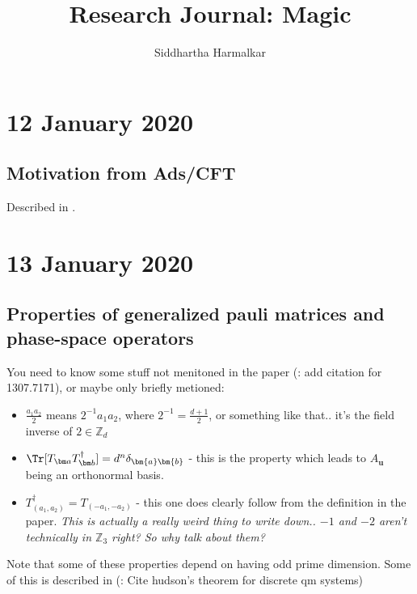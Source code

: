\documentclass{report}
\title{Research Journal: Magic}
\author{Siddhartha Harmalkar}
\begin{document}
\maketitle

 \tableofcontents
 
 \chapter{12 January 2020}
 
 \section{Motivation from Ads/CFT}
 
 Described in \cite{cft_state_conjecture}.
 
 \chapter{13 January 2020}
 
 \section{Properties of generalized pauli matrices and phase-space operators}
 
 You need to know some stuff not menitoned in the paper (\todo: add citation for 1307.7171), or maybe only briefly metioned:
 \begin{itemize}
 \item $\frac{a_1a_2}{2}$ means $2^{-1}a_1a_2$, where $2^{-1}=\frac{d+1}{2}$, or something like that.. it's the field inverse of $2\in\mathbb Z_d$
 \item $\Tr[T_{\bm a}T_{\bm b}^\dagger]=d^n\delta_{\bm {a}\bm {b}}$ - this is the property which leads to $A_{\bm u}$ being an orthonormal basis. 
 \item $T_{(a_1,a_2)}^{\dagger}=T_{(-a_1,-a_2)}$ - this one does clearly follow from the definition in the paper. \textit{This is actually a really weird thing to write down.. $-1$ and $-2$ aren't technically in $\mathbb Z_3$ right? So why talk about them?}
 \end{itemize}
Note that some of these properties depend on having odd prime dimension. Some of this is described in (\todo: Cite hudson's theorem for discrete qm systems)
 
\end{document}
